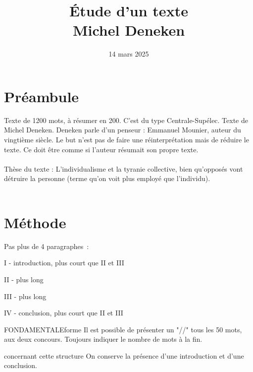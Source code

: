 

\title{\Large Étude d'un texte \\ \Huge Michel Deneken}
\date{14 mars 2025}


\maketitle

\section{Préambule}

Texte de 1200 mots, à résumer en 200. C'est du type Centrale-Supélec. Texte de Michel Deneken. Deneken parle d'un penseur : Emmanuel Mounier, auteur du vingtième siècle. Le but n'est pas de faire une réinterprétation mais de réduire le texte. Ce doit être comme si l'auteur résumait son propre texte.\\\\

Thèse du texte : L'individualisme et la tyranie collective, bien qu'opposés vont détruire la personne (terme qu'on voit plus employé que l'individu).\\\\

\section{Méthode}
Pas plus de 4 paragraphes~:
\begin{enumeratebf}
    \item I - introduction, plus court que II et III
    \item II - plus long
    \item III - plus long
    \item IV - conclusion, plus court que II et III
\end{enumeratebf}

\begin{remarque}{FONDAMENTALE}{forme}
    Il est possible de présenter un "//" tous les 50 mots, aux deux concours. Toujours indiquer le nombre de mots à la fin.
\end{remarque}

\begin{remarque}{1}{concernant cette structure}
    On conserve la présence d'une introduction et d'une conclusion.
\end{remarque}

